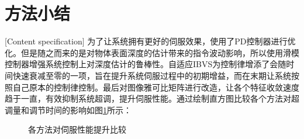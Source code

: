 \documentclass[fontset=fandol,type=bachelor,campus=harbin,bsmainpagenumberline=true]{hithesisbook}
\begin{document}
\section{方法小结}[Content specification]
为了让系统拥有更好的伺服效果，使用了PD控制器进行优化。但是随之而来的是对物体表面深度的估计带来的指令波动影响，所以使用滑模控制器增强系统控制上对深度估计的鲁棒性。自适应IBVS为控制律增添了会随时间快速衰减至零的一项，旨在提升系统伺服过程中的初期增益，而在末期让系统按照自己原本的控制律控制。最后对图像雅可比矩阵进行改造，让各个特征收敛速度趋于一直，有效抑制系统超调，提升伺服性能。通过绘制直方图比较各个方法对超调量和调节时间的影响如图\ref{各方法对伺服性能提升比较}所示：
\begin{figure}[h]
	\centering
	\caption{各方法对伺服性能提升比较}
	\label{各方法对伺服性能提升比较}
\end{figure}
\end{document}
